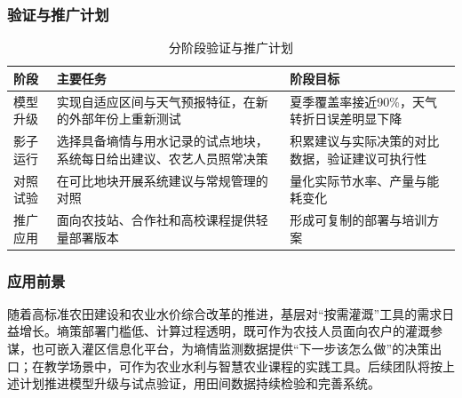 \subsubsection{验证与推广计划}
\begin{table}[H]\centering\small
\caption{分阶段验证与推广计划}\label{tab:roadmap}
\begin{tabularx}{\linewidth}{@{}p{.16\linewidth}XX@{}}\toprule
阶段 & 主要任务 & 阶段目标\\\midrule
模型升级 & 实现自适应区间与天气预报特征，在新的外部年份上重新测试 & 夏季覆盖率接近90\%，天气转折日误差明显下降\\
影子运行 & 选择具备墒情与用水记录的试点地块，系统每日给出建议、农艺人员照常决策 & 积累建议与实际决策的对比数据，验证建议可执行性\\
对照试验 & 在可比地块开展系统建议与常规管理的对照 & 量化实际节水率、产量与能耗变化\\
推广应用 & 面向农技站、合作社和高校课程提供轻量部署版本 & 形成可复制的部署与培训方案\\\bottomrule
\end{tabularx}
\end{table}

\subsubsection{应用前景}
随着高标准农田建设和农业水价综合改革的推进，基层对“按需灌溉”工具的需求日益增长。墒策部署门槛低、计算过程透明，既可作为农技人员面向农户的灌溉参谋，也可嵌入灌区信息化平台，为墒情监测数据提供“下一步该怎么做”的决策出口；在教学场景中，可作为农业水利与智慧农业课程的实践工具。后续团队将按上述计划推进模型升级与试点验证，用田间数据持续检验和完善系统。
